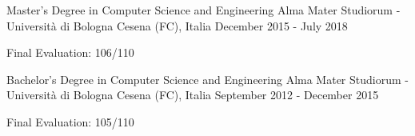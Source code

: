 

\begin{cventries}

  \cventry
    {Master's Degree in Computer Science and Engineering} %
    {Alma Mater Studiorum - Università di Bologna} %
    {Cesena (FC), Italia} %
    {December 2015 - July 2018} %
    {
      \begin{cvitems} %
        \item {Final Evaluation: 106/110}
      \end{cvitems}
    }

	\cventry
	{Bachelor's Degree in Computer Science and Engineering} %
	{Alma Mater Studiorum - Università di Bologna} %
	{Cesena (FC), Italia} %
	{September 2012 - December 2015} %
	{
		\begin{cvitems} %
			\item {Final Evaluation: 105/110}
		\end{cvitems}
	}

\end{cventries}
